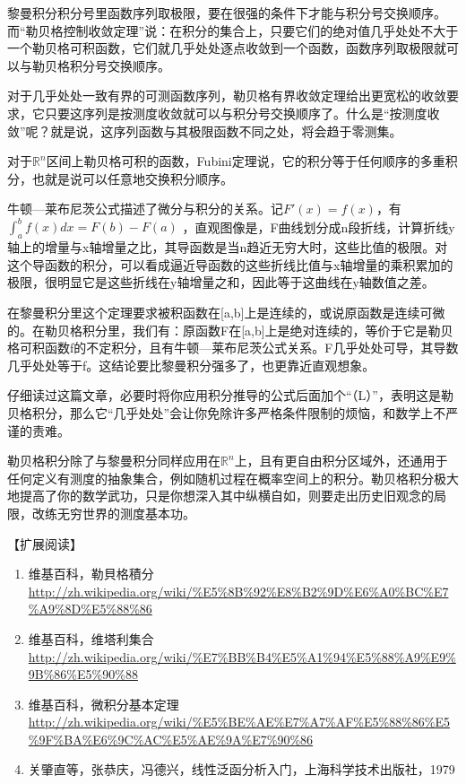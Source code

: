 黎曼积分积分号里函数序列取极限，要在很强的条件下才能与积分号交换顺序。而“勒贝格控制收敛定理”说：在积分的集合上，只要它们的绝对值几乎处处不大于一个勒贝格可积函数，它们就几乎处处逐点收敛到一个函数，函数序列取极限就可以与勒贝格积分号交换顺序。

对于几乎处处一致有界的可测函数序列，勒贝格有界收敛定理给出更宽松的收敛要求，它只要这序列是按测度收敛就可以与积分号交换顺序了。什么是“按测度收敛”呢？就是说，这序列函数与其极限函数不同之处，将会趋于零测集。

对于$ \mathbb{R}^n $区间上勒贝格可积的函数，Fubini定理说，它的积分等于任何顺序的多重积分，也就是说可以任意地交换积分顺序。

牛顿—莱布尼茨公式描述了微分与积分的关系。记$ F'(x)=f(x) $，有 $ \int_a^b f(x)dx = F(b)-F(a) $ ，直观图像是，F曲线划分成n段折线，计算折线y轴上的增量与x轴增量之比，其导函数是当n趋近无穷大时，这些比值的极限。对这个导函数的积分，可以看成逼近导函数的这些折线比值与x轴增量的乘积累加的极限，很明显它是这些折线在y轴增量之和，因此等于这曲线在y轴数值之差。

在黎曼积分里这个定理要求被积函数在[a,b]上是连续的，或说原函数是连续可微的。在勒贝格积分里，我们有：原函数F在[a,b]上是绝对连续的，等价于它是勒贝格可积函数f的不定积分，且有牛顿—莱布尼茨公式关系。F几乎处处可导，其导数几乎处处等于f。这结论要比黎曼积分强多了，也更靠近直观想象。

仔细读过这篇文章，必要时将你应用积分推导的公式后面加个“（L）”，表明这是勒贝格积分，那么它“几乎处处”会让你免除许多严格条件限制的烦恼，和数学上不严谨的责难。

勒贝格积分除了与黎曼积分同样应用在$ \mathbb{R}^n $上，且有更自由积分区域外，还通用于任何定义有测度的抽象集合，例如随机过程在概率空间上的积分。勒贝格积分极大地提高了你的数学武功，只是你想深入其中纵横自如，则要走出历史旧观念的局限，改练无穷世界的测度基本功。


【扩展阅读】

\begin{enumerate}
	\item 维基百科，勒貝格積分
	\url{http://zh.wikipedia.org/wiki/\%E5\%8B\%92\%E8\%B2\%9D\%E6\%A0\%BC\%E7\%A9\%8D\%E5\%88\%86}
	
	\item 维基百科，维塔利集合\url{http://zh.wikipedia.org/wiki/\%E7\%BB\%B4\%E5\%A1\%94\%E5\%88\%A9\%E9\%9B\%86\%E5\%90\%88}
	
	\item 维基百科，微积分基本定理\url{http://zh.wikipedia.org/wiki/\%E5\%BE\%AE\%E7\%A7\%AF\%E5\%88\%86\%E5\%9F\%BA\%E6\%9C\%AC\%E5\%AE\%9A\%E7\%90\%86}
	
	\item 关肇直等，张恭庆，冯德兴，线性泛函分析入门，上海科学技术出版社，1979
\end{enumerate}

